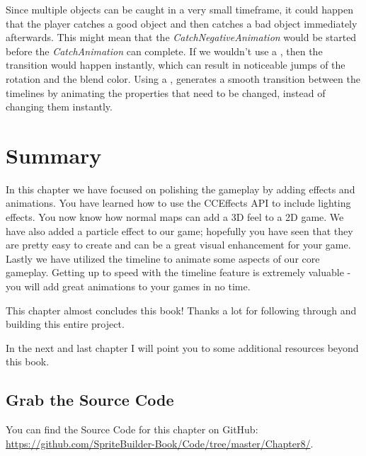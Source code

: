 Since multiple objects can be caught in a very small timeframe, it could happen
that the player catches a good object and then catches a bad object immediately
afterwards. This might mean that the \textit{CatchNegativeAnimation} would be
started before the \textit{CatchAnimation} can complete. If we wouldn't use a
, then the transition would happen instantly, which
can result in noticeable jumps of the rotation and the blend color. Using a
, \cocos{} generates a smooth transition between the 
timelines by animating the properties that need to be changed, instead of changing 
them instantly.

\section{Summary}

In this chapter we have focused on polishing the gameplay by adding effects and
animations. You have learned how to use the CCEffects API to include lighting
effects. You now know how normal maps can add a 3D feel to a 2D game. We have
also added a particle effect to our game; hopefully you have seen that they are
pretty easy to create and can be a great visual enhancement for your game.
Lastly we have utilized the \SB{} timeline to animate some aspects of our core
gameplay. Getting up to speed with the timeline feature is extremely valuable -
you will add great animations to your games in no time.

This chapter almost concludes this book! Thanks a lot for following through and
building this entire project.

In the next and last chapter I will point you to some additional resources
beyond this book.

\subsection{Grab the Source Code}
You can find the Source Code for this chapter on GitHub:
\url{https://github.com/SpriteBuilder-Book/Code/tree/master/Chapter8/}.
